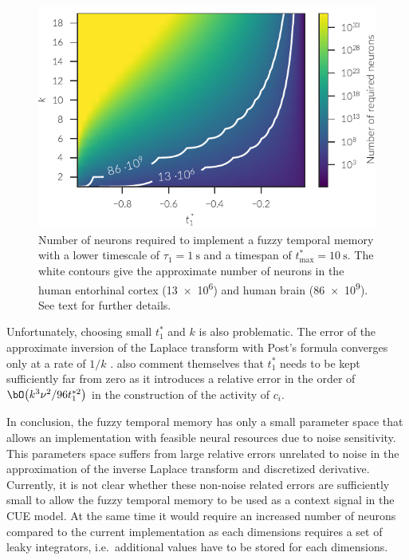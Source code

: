 \begin{figure}
    \centering
    \includegraphics{figures/fuzzy-mem-n-neurons}
    \caption[Number of neurons required to implement a fuzzy temporal memory]{Number of neurons required to implement a fuzzy temporal memory with a lower timescale of $\tau_1 = \SI{1}{\second}$ and a timespan of $t^*_{\max} = \SI{10}{\second}$. The white contours give the approximate number of neurons in the human entorhinal cortex (\num{13e6}) and human brain (\num{86e9}). See text for further details.}\label{fig:fuzzy-mem-n-neurons}
\end{figure}

Unfortunately, choosing small $t^*_1$ and $k$ is also problematic.
The error of the approximate inversion of the Laplace transform with Post's formula converges only at a rate of $1/k$ \parencite{vukimtuan2000}.
\Textcite{shankar2013} also comment themselves that $t^*_1$ needs to be kept sufficiently far from zero as it introduces a relative error in the order of $\bO\big(k^3\nu^2/96 t^{*2}_1\big)$ in the construction of the activity of $c_i$.

In conclusion, the fuzzy temporal memory has only a small parameter space that allows an implementation with feasible neural resources due to noise sensitivity.
This parameters space suffers from large relative errors unrelated to noise in the approximation of the inverse Laplace transform and discretized derivative.
Currently, it is not clear whether these non-noise related errors are sufficiently small to allow the fuzzy temporal memory to be used as a context signal in the CUE model.
At the same time it would require an increased number of neurons compared to the current implementation as each dimensions requires a set of leaky integrators, i.e.\ additional values have to be stored for each dimensions.


